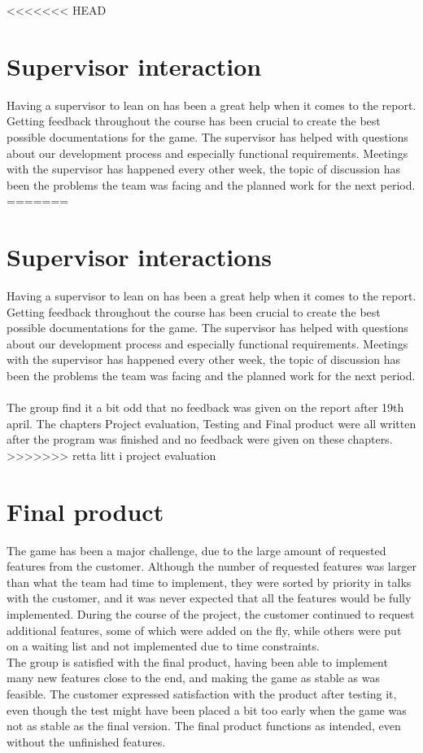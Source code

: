 <<<<<<< HEAD
\section{Supervisor interaction}
Having a supervisor to lean on has been a great help when it comes to the report. Getting feedback throughout the course has been crucial to create the best possible documentations for the game. The supervisor has helped with questions about our development process and especially functional requirements. Meetings with the supervisor has happened every other week, the topic of discussion has been the problems the team was facing and the planned work for the next period. 
=======
\section{Supervisor interactions}
Having a supervisor to lean on has been a great help when it comes to the report. Getting feedback throughout the course has been crucial to create the best possible documentations for the game. The supervisor has helped with questions about our development process and especially functional requirements. Meetings with the supervisor has happened every other week, the topic of discussion has been the problems the team was facing and the planned work for the next period. \\
\\
The group find it a bit odd that no feedback was given on the report after 19th april. The chapters Project evaluation, Testing and Final product were all written after the program was finished and no feedback were given on these chapters.
>>>>>>> retta litt i project evaluation

\section{Final product}

The game has been a major challenge, due to the large amount of requested features from the customer. Although the number of requested features was larger than what the team had time to implement, they were sorted by priority in talks with the customer, and it was never expected that all the features would be fully implemented. During the course of the project, the customer continued to request additional features, some of which were added on the fly, while others were put on a waiting list and not implemented due to time constraints.\\
\newline
The group is satisfied with the final product, having been able to implement many new features close to the end, and making the game as stable as was feasible. The customer expressed satisfaction with the product after testing it, even though the test might have been placed a bit too early when the game was not as stable as the final version. The final product functions as intended, even without the unfinished features.\\

